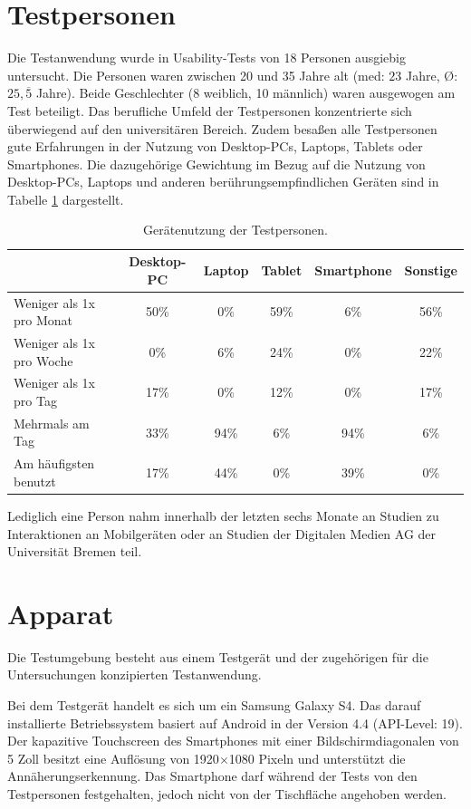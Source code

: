\documentclass[12pt,bibliography=totocnumbered,listof=totocnumbered,abstracton]{scrreprt}
\begin{document}
\section{Testpersonen}
Die Testanwendung wurde in Usability-Tests von 18 Personen ausgiebig untersucht. Die Personen waren zwischen 20 und 35 Jahre alt (med: $23$ Jahre, \O: $25{,}\overline 5$ Jahre). Beide Geschlechter (8 weiblich, 10 männlich) waren ausgewogen am Test beteiligt. Das berufliche Umfeld der Testpersonen konzentrierte sich überwiegend auf den universitären Bereich. Zudem besaßen alle Testpersonen gute Erfahrungen in der Nutzung von Desktop-PCs, Laptops, Tablets oder Smartphones. Die dazugehörige Gewichtung im Bezug auf die Nutzung von Desktop-PCs, Laptops und anderen berührungsempfindlichen Geräten sind in Tabelle \ref{nutzungtestpersonen} dargestellt.
\begin{table}
\centering
\renewcommand{\arraystretch}{2}
\setlength{\tabcolsep}{4pt}
\begin{tabular}{ p{4.8cm} | c c c c c}
& Desktop-PC & Laptop & Tablet & Smartphone & Sonstige\\\hline
Weniger als 1x pro Monat & 50\% & 0\% & 59\% & 6\% & 56\%\\
Weniger als 1x pro Woche & 0\% & 6\% & 24\% & 0\% & 22\% \\
Weniger als 1x pro Tag & 17\% & 0\% & 12\% & 0\% & 17\% \\
Mehrmals am Tag & 33\% & 94\% & 6\% & 94\% & 6\% \\
\hline
Am häufigsten benutzt & 17\% & 44\% & 0\% & 39\% & 0\% \\
\end{tabular}
\caption{Gerätenutzung der Testpersonen.}
\label{nutzungtestpersonen}
\end{table}
Lediglich eine Person nahm innerhalb der letzten sechs Monate an Studien zu Interaktionen an Mobilgeräten oder an Studien der Digitalen Medien AG der Universität Bremen teil.

\section{Apparat}
Die Testumgebung besteht aus einem Testgerät und der zugehörigen für die Untersuchungen konzipierten Testanwendung.

Bei dem Testgerät handelt es sich um ein Samsung Galaxy S4. Das darauf installierte Betriebssystem basiert auf Android in der Version 4.4 (API-Level: 19). Der kapazitive Touchscreen des Smartphones mit einer Bildschirmdiagonalen von 5 Zoll besitzt eine Auflösung von 1920$\times$1080 Pixeln und unterstützt die Annäherungserkennung. Das Smartphone darf während der Tests von den Testpersonen festgehalten, jedoch nicht von der Tischfläche angehoben werden.
\end{document}
